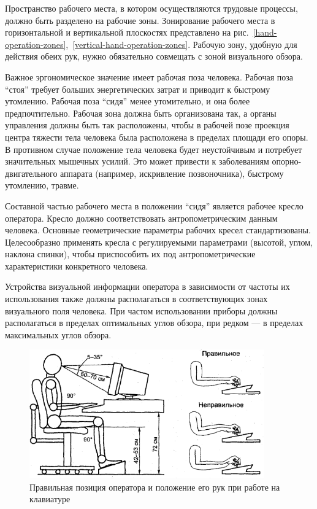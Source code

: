 Пространство рабочего места, в котором осуществляются трудовые процессы, должно быть разделено на рабочие зоны. Зонирование рабочего места в горизонтальной и вертикальной плоскостях представлено на рис.~\ref{hand-operation-zones},~\ref{vertical-hand-operation-zones}. Рабочую зону, удобную для действия обеих рук, нужно обязательно совмещать с зоной визуального обзора.\cite{devisilov09}

Важное эргономическое значение имеет рабочая поза человека. Рабочая поза ``стоя'' требует больших энергетических затрат и приводит к быстрому утомлению. Рабочая поза ``сидя'' менее утомительно, и она более предпочтительно. Рабочая зона должна быть организована так, а органы управления должны быть так расположены, чтобы в рабочей позе проекция центра тяжести тела человека была расположена в пределах площади его опоры. В противном случае положение тела человека будет неустойчивым и потребует значительных мышечных усилий. Это может привести к заболеваниям опорно-двигательного аппарата (например, искривление позвоночника), быстрому утомлению, травме.\cite{devisilov09}

Составной частью рабочего места в положении ``сидя'' является рабочее кресло оператора. Кресло должно соответствовать антропометрическим данным человека. Основные геометрические параметры рабочих кресел стандартизованы. Целесообразно применять кресла с регулируемыми параметрами (высотой, углом, наклона спинки), чтобы приспособить их под антропометрические характеристики конкретного человека.\cite{devisilov09}

Устройства визуальной информации оператора в зависимости от частоты их использования также должны располагаться в соответствующих зонах визуального поля человека. При частом использовании приборы должны располагаться в пределах оптимальных углов обзора, при редком --- в пределах максимальных углов обзора.\cite{devisilov09}

\begin{figure}
  \centering
  \includegraphics[width=0.9\textwidth]{images/mihnuk-3-14}
  \caption{Правильная позиция оператора и положение его рук при работе на клавиатуре\label{operator-position}}
\end{figure}

